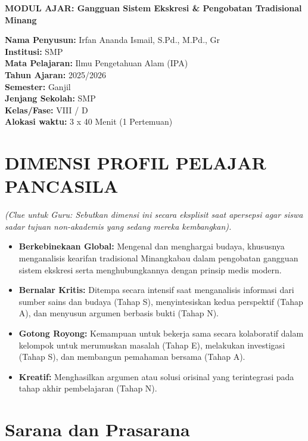 \documentclass[a4paper,12pt]{article}
\begin{document}
\begin{center}
{\Large\textbf{MODUL AJAR: Gangguan Sistem Ekskresi \& Pengobatan Tradisional Minang}}
\end{center}

\vspace{0.5cm}

\begin{tcolorbox}[mainbox]
\textbf{Nama Penyusun:} Irfan Ananda Ismail, S.Pd., M.Pd., Gr \\
\textbf{Institusi:} SMP \\
\textbf{Mata Pelajaran:} Ilmu Pengetahuan Alam (IPA) \\
\textbf{Tahun Ajaran:} 2025/2026 \\
\textbf{Semester:} Ganjil \\
\textbf{Jenjang Sekolah:} SMP \\
\textbf{Kelas/Fase:} VIII / D \\
\textbf{Alokasi waktu:} 3 x 40 Menit (1 Pertemuan)
\end{tcolorbox}

\section{DIMENSI PROFIL PELAJAR PANCASILA}
\textit{(Clue untuk Guru: Sebutkan dimensi ini secara eksplisit saat apersepsi agar siswa sadar tujuan non-akademis yang sedang mereka kembangkan).}

\begin{itemize}
\item \textbf{Berkebinekaan Global:} Mengenal dan menghargai budaya, khususnya menganalisis kearifan tradisional Minangkabau dalam pengobatan gangguan sistem ekskresi serta menghubungkannya dengan prinsip medis modern.
\item \textbf{Bernalar Kritis:} Ditempa secara intensif saat menganalisis informasi dari sumber sains dan budaya (Tahap S), menyintesiskan kedua perspektif (Tahap A), dan menyusun argumen berbasis bukti (Tahap N).
\item \textbf{Gotong Royong:} Kemampuan untuk bekerja sama secara kolaboratif dalam kelompok untuk merumuskan masalah (Tahap E), melakukan investigasi (Tahap S), dan membangun pemahaman bersama (Tahap A).
\item \textbf{Kreatif:} Menghasilkan argumen atau solusi orisinal yang terintegrasi pada tahap akhir pembelajaran (Tahap N).
\end{itemize}

\section{Sarana dan Prasarana}
\end{document}

